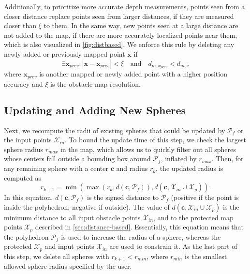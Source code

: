 \documentclass[letterpaper, 10 pt, journal, twoside]{IEEEtran}
\newcommand{\todo}[1]{{\hypersetup{allcolors=red}{\color{red} {#1}}}}
\begin{document}
{Additionally, to prioritize more accurate depth measurements, points seen from a closer distance replace points seen from larger distances, if they are measured closer than $\xi$ to them.} 
In the same way, new points seen at a large distance are not added to the map, if there are more accurately localized points near them, which is also visualized in \autoref{fig:distbased}. 
We enforce this rule by deleting any newly added or previously mapped point $\mathbf{x}$ if
\begin{equation}
  \exists \mathbf{x}_{prev}: |\mathbf{x} - \mathbf{x}_{prev}| < \xi \quad \text{and} \quad d_{m,x_{prev}}  < d_{m,x}
\end{equation}
where $\mathbf{x}_{prev}$ is another mapped or newly added point with a higher position accuracy and {$\xi$ is the obstacle map resolution.}

\subsection{Updating and Adding New Spheres}
\label{sec:existing_spheres_update}
Next, we recompute the radii of existing spheres that could be updated by $\mathcal{P}_f$ or the input points $\mathcal{X}_{in}$.
To bound the update time of this step, we check the largest sphere radius $r_{max}$ in the map, which allows us to quickly filter out all spheres whose centers fall outside a bounding box around $\mathcal{P}_f$, inflated by $r_{max}$. 
Then, for any remaining sphere with a center $\mathbf{c}$ and radius $r_{k}$, the updated radius is computed as
\begin{equation}
  r_{k+1} = \min \left( \max \left( r_{k}, d(\mathbf{c}, \mathcal{P}_f) \right)
  , d(\mathbf{c}, \mathcal{X}_{in} \cup \mathcal{X}_p) \right).
  \label{eq:update}
\end{equation}
In this equation, $d(\mathbf{c}, \mathcal{P}_f)$ is the signed distance to $\mathcal{P}_f$ (positive if the point is inside the polyhedron, negative if outside).
The value of $d(\mathbf{c},\mathcal{X}_{in} \cup \mathcal{X}_p)$ is the minimum distance to all input obstacle points $\mathcal{X}_{in}$, and to the protected map points $\mathcal{X}_p$ described in \autoref{sec:distance-based}.
Essentially, this equation means that the polyhedron $\mathcal{P}_f$ is used to increase the radius of a sphere, whereas the protected $\mathcal{X}_p$ and input points $\mathcal{X}_{in}$ are used to constrain it.
As the last part of this step, we delete all spheres with $r_{k+1} < r_{min}$, where $r_{min}$ is the smallest allowed sphere radius specified by the user.
\end{document}
